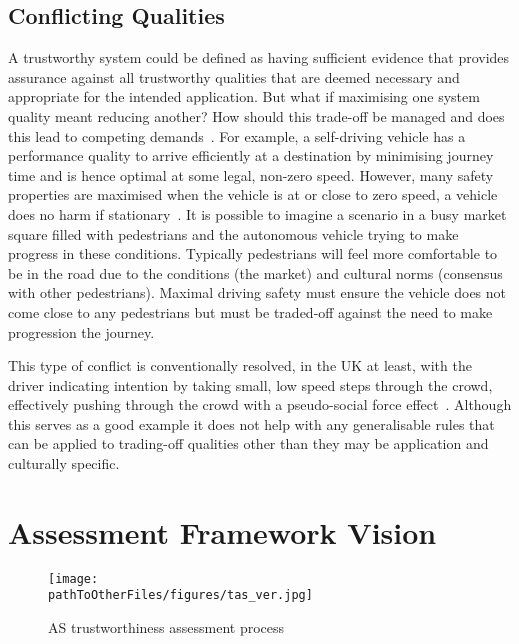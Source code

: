 \subsection{Conflicting Qualities} \label{sec:conflict}

A trustworthy system could be defined as having sufficient evidence that provides assurance against all trustworthy qualities that are deemed necessary and appropriate for the intended application. But what if maximising one system quality meant reducing another? How should this trade-off be managed and does this lead to competing demands~\cite{Abeywickrama2022}. 
%
For example, a self-driving vehicle has a performance quality to arrive efficiently at a destination by minimising journey time and is hence optimal at some legal, non-zero speed. However, many safety properties are maximised when the vehicle is at or close to zero speed, a vehicle does no harm if stationary~\cite{harper2021safety}. 
%
It is possible to imagine a scenario in a busy market square filled with pedestrians and the autonomous vehicle trying to make progress in these conditions. Typically pedestrians will feel more comfortable to be in the road due to the conditions (the market) and cultural norms (consensus with other pedestrians). Maximal driving safety must ensure the vehicle does not come close to any pedestrians but must be traded-off against the need to make progression the journey.

This type of conflict is conventionally resolved, in the UK at least, with the driver indicating intention by taking small, low speed steps through the crowd, effectively pushing through the crowd with a pseudo-social force effect~\cite{helbing1995social}. 
%
Although this serves as a good example it does not help with any generalisable rules that can be applied to trading-off qualities other than they may be application and culturally specific. 

\section{Assessment Framework Vision} \label{sec:AssFramVis}

\begin{figure*}[]
    \centering
    \texttt{[image: \\pathToOtherFiles/figures/tas\_ver.jpg]}
    \caption{AS trustworthiness assessment process}
    \label{fig:tas_ver}
\end{figure*}

